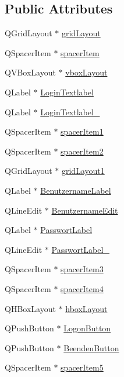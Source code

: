 \subsection*{Public Attributes}
\begin{CompactItemize}
\item 
QGridLayout $\ast$ \hyperlink{class_ui___logon_dialog_class_b5e37fc89aeb31e343e95b345bb02a58}{gridLayout}
\item 
QSpacerItem $\ast$ \hyperlink{class_ui___logon_dialog_class_e246669a0868678c57146dba5fc08c46}{spacerItem}
\item 
QVBoxLayout $\ast$ \hyperlink{class_ui___logon_dialog_class_d82710293b7240d73c8ada0cb2bf0265}{vboxLayout}
\item 
QLabel $\ast$ \hyperlink{class_ui___logon_dialog_class_799b450829800de3f59c90212c578c8a}{LoginTextlabel}
\item 
QLabel $\ast$ \hyperlink{class_ui___logon_dialog_class_6094bf55772b49a1910aa264b8073a37}{LoginTextlabel\_}
\item 
QSpacerItem $\ast$ \hyperlink{class_ui___logon_dialog_class_f838e191fe50009cbf8f8c599468d00e}{spacerItem1}
\item 
QSpacerItem $\ast$ \hyperlink{class_ui___logon_dialog_class_57c7c653c9e951e74cb5fd926f1243c8}{spacerItem2}
\item 
QGridLayout $\ast$ \hyperlink{class_ui___logon_dialog_class_fce32135738822d47d0f65ddfe08f787}{gridLayout1}
\item 
QLabel $\ast$ \hyperlink{class_ui___logon_dialog_class_e14889d7536d1fb187db6ed2611c70b1}{BenutzernameLabel}
\item 
QLineEdit $\ast$ \hyperlink{class_ui___logon_dialog_class_c88010fa89bfdf2e7c7eb6e260d2ded1}{BenutzernameEdit}
\item 
QLabel $\ast$ \hyperlink{class_ui___logon_dialog_class_a216bf5d0e32754d5448283f98ec466a}{PasswortLabel}
\item 
QLineEdit $\ast$ \hyperlink{class_ui___logon_dialog_class_db8d5808ae6a2d8c3fa7ee4c6376ce00}{PasswortLabel\_}
\item 
QSpacerItem $\ast$ \hyperlink{class_ui___logon_dialog_class_afa5df6139db9af18a4788bbe7004453}{spacerItem3}
\item 
QSpacerItem $\ast$ \hyperlink{class_ui___logon_dialog_class_55ec39807e963fa89e3f0b6af5342118}{spacerItem4}
\item 
QHBoxLayout $\ast$ \hyperlink{class_ui___logon_dialog_class_f31ca5cba4985b8ce2f12147194435b2}{hboxLayout}
\item 
QPushButton $\ast$ \hyperlink{class_ui___logon_dialog_class_bf53b358f3ad06c45d331e4b5109fd52}{LogonButton}
\item 
QPushButton $\ast$ \hyperlink{class_ui___logon_dialog_class_9f8ea43f1be904f080b5056f4bd213a0}{BeendenButton}
\item 
QSpacerItem $\ast$ \hyperlink{class_ui___logon_dialog_class_ceae637a726d694fc7423a135ec56a47}{spacerItem5}
\end{CompactItemize}


